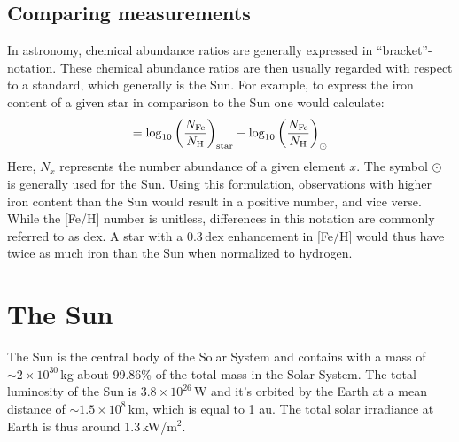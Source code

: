 \subsection{Comparing measurements}


In astronomy, chemical abundance ratios are generally expressed in ``bracket''-notation. These chemical abundance ratios are then usually regarded with respect to a standard, which generally is the Sun. For example, to express the iron content of a given star in comparison to the Sun one would calculate:
\begin{equation}
    [\tn{Fe}/\tn{H}] = \log_{10} \left( \frac{N_\tn{Fe}}{N_\tn{H}}\right)_\tn{star} - \log_{10} \left( \frac{N_\tn{Fe}}{N_\tn{H}}\right)_\odot
\end{equation}
Here, $N_x$ represents the number abundance of a given element $x$. The symbol $\odot$ is generally used for the Sun. Using this formulation, observations with higher iron content than the Sun would result in a positive number, and vice verse. While the [Fe/H] number is unitless, differences in this notation are commonly referred to as \ac{dex}. A star with a $0.3$\,dex enhancement in [Fe/H] would thus have twice as much iron than the Sun when normalized to hydrogen.




\section{The Sun}

The Sun is the central body of the Solar System and contains with a mass of $\sim2\times10^{30}$\,kg about 99.86\% of the total mass in the Solar System. The total luminosity of the Sun is $3.8\times10^{26}$\,W and it's orbited by the Earth at a mean distance of $\sim1.5\times10^{8}$\,km, which is equal to 1 \ac{au}. The total solar irradiance at Earth is thus around 1.3\,kW/m$^{2}$.

